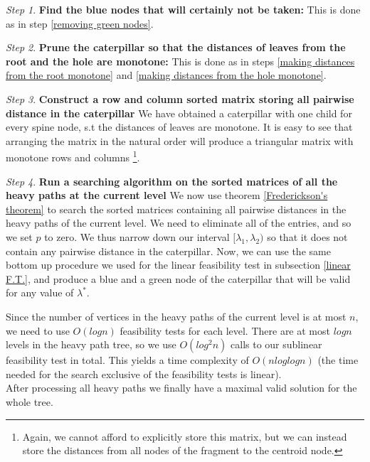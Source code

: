 \documentclass[11pt,a4paper]{article}
\theoremstyle{definition}
\theoremstyle{remark}
\newtheorem{step}{Step}[section]
\begin{document}
\begin{step}
\textbf{Find the blue nodes that will certainly not be taken:}
This is done as in step \ref{removing green nodes}.
\end{step}
\begin{step}
\textbf{Prune the caterpillar so that the distances of leaves from the root and the hole are monotone:}
This is done as in steps \ref{making distances from the root monotone} and \ref{making distances from the hole monotone}.
\end{step}
\begin{step}
\textbf{Construct a row and column sorted matrix storing all pairwise distance in the caterpillar}
We have obtained a caterpillar with one child for every spine node, s.t the distances of leaves are monotone. It is easy to see that arranging the matrix in the natural order will produce a triangular matrix with monotone rows and columns \footnote{Again, we cannot afford to explicitly store this matrix, but we can instead store the distances from all nodes of the fragment to the centroid node.}.
\end{step}
\begin{step}
\textbf{Run a searching algorithm on the sorted matrices of all the heavy paths at the current level}
We now use theorem \ref{Frederickson's theorem} to search the sorted matrices containing all pairwise distances in the heavy paths of the current level. We need to eliminate all of the entries, and so we set $p$ to zero. We thus narrow down our interval $[\lambda_1,\lambda_2)$ so that it does not contain any pairwise distance in the caterpillar. Now, we can use the same bottom up procedure we used for the linear feasibility test in subsection \ref{linear F.T.}, and produce a blue and a green node of the caterpillar that will be valid for any value of $\lambda^*$.
\end{step}
Since the number of vertices in the heavy paths of the current level is at most $n$, we need to use $O(logn)$ feasibility tests for each level. There are at most $logn$ levels in the heavy path tree, so we use $O(log^2n)$ calls to our sublinear feasibility test in total. This yields a time complexity of $O(nloglogn)$ (the time needed for the search exclusive of the feasibility tests is linear). \\
After processing all heavy paths we finally have a maximal valid solution for the whole tree.
\end{document}
